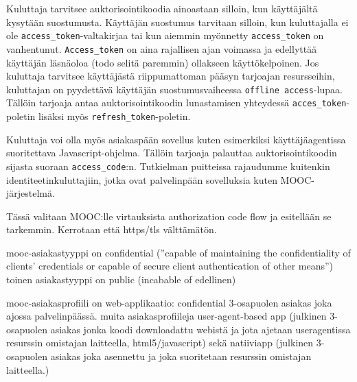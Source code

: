 \documentclass[finnish,gradu]{tktltiki}
\begin{document}
  Kuluttaja tarvitsee auktorisointikoodia ainoastaan silloin, kun käyttäjältä kysytään suostumusta. Käyttäjän suostumus tarvitaan silloin, kun kuluttajalla ei ole \verb!access_token!-valtakirjaa tai kun aiemmin myönnetty \verb!access_token! on vanhentunut. \verb!Access_token! on aina rajallisen ajan voimassa ja edellyttää käyttäjän läsnäoloa (todo selitä paremmin) ollakseen käyttökelpoinen. Jos kuluttaja tarvitsee käyttäjästä riippumattoman pääsyn tarjoajan resursseihin, kuluttajan on pyydettävä käyttäjän suostumusvaiheessa \verb!offline access!-lupaa. Tällöin tarjoaja antaa auktorisointikoodin lunastamisen yhteydessä \verb!acces_token!-poletin lisäksi myös \verb!refresh_token!-poletin.

  Kuluttaja voi olla myös asiakaspään sovellus kuten esimerkiksi käyttäjäagentissa suoritettava Javascript-ohjelma. Tällöin tarjoaja palauttaa auktorisointikoodin sijasta suoraan \verb!access_code!:n. Tutkielman puitteissa rajaudumme kuitenkin identiteetinkuluttajiin, jotka ovat palvelinpään sovelluksia kuten MOOC-järjestelmä.

  Tässä valitaan MOOC:lle virtauksista authorization code flow ja esitellään se tarkemmin.
  Kerrotaan että https/tls välttämätön.

  mooc-asiakastyyppi on confidential (''capable of maintaining the confidentiality of clients' credentials or capable of secure client authentication of other means'')
  toinen asiakastyyppi on public (incabable of edellinen)

  mooc-asiakasprofiili on web-applikaatio: confidential 3-osapuolen asiakas joka ajossa palvelinpäässä.
  muita asiakasprofiileja user-agent-based app (julkinen 3-osapuolen asiakas jonka koodi downloadattu webistä ja jota ajetaan useragentissa resurssin omistajan laitteella, html5/javascript) sekä natiiviapp (julkinen 3-osapuolen asiakas joka asennettu ja joka suoritetaan resurssin omistajan laitteella.)

\end{document}
